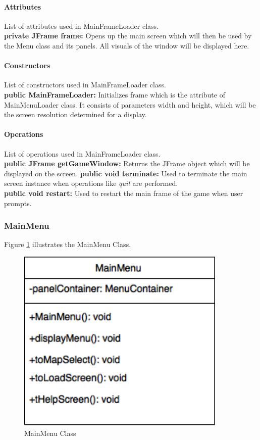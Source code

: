\documentclass[12pt]{article} %
\begin{document}
\paragraph{Attributes \\}

List of attributes used in MainFrameLoader class.\\
\textbf{private JFrame frame:} Opens up the main screen which will then be used by the Menu class and its panels.  All visuals of the window will be displayed here.\\

\paragraph{Constructors \\}
List of constructors used in MainFrameLoader class.\\
\textbf{public MainFrameLoader:} Initializes frame which is the attribute of MainMenuLoader class.  It consists of parameters width and height, which will be the screen resolution determined for a display.

\paragraph{Operations \\}
List of operations used in MainFrameLoader class.\\
\textbf{public JFrame getGameWindow:} Returns the JFrame object which will be displayed on the screen.
\textbf{public void terminate:} Used to terminate the main screen instance when operations like \textit{quit} are performed.\\
\textbf{public void restart:} Used to restart the main frame of the game when user prompts.

\subsubsection{MainMenu}

Figure \ref{fig:mainmenu} illustrates the MainMenu Class.
\begin{figure}[h!]
   \centering
   \vspace{10pt}%
   \includegraphics[width=10cm]{mainmenu.png}
   \caption{MainMenu Class}
   \label{fig:mainmenu}
\end{figure}
\end{document}
